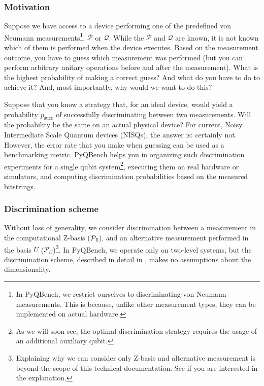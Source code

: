 \documentclass[preprint,12pt, a4paper]{elsarticle}
\newcommand{\1}{{\rm 1\hspace{-0.9mm}l}}
\newcommand{\Id}{{\rm 1\hspace{-0.9mm}l}}
\newcommand{\PP}{\mathcal{P}}
\newcommand{\QQ}{\mathcal{Q}}
\begin{document}
\subsubsection{Motivation}

Suppose we have access to a device performing one of the predefined von Neumann
measurements\footnote{In PyQBench, we restrict ourselves to discriminating von Neumann measurements.
This is because, unlike other measurement types, they can be implemented on actual hardware.
},  $\PP$ or $\QQ$. While the $\PP$ and $\QQ$ are known, it is not known which of them is
performed when the device executes. Based on the measurement outcome, you have to guess which
measurement was performed (but you can perform arbitrary unitary operations before and after the
measurement). What is the highest probability of making a correct guess? And what do you have to do
to achieve it? And, most importantly, why would we want to do this?

Suppose that you know a strategy that, for an ideal device, would yield a probability
$p_{\text{succ}}$ of successfully discriminating between two measurements. Will the probability be
the same on an actual physical device? For current, Noisy Intermediate Scale Quantum devices
(NISQs), the answer is: certainly not. However, the error rate that you make when guessing can be
used as a benchmarking metric. PyQBench helps you in organizing such discrimination experiments for
a single qubit system\footnote{As we will soon see, the optimal discrimination strategy requires
the usage of an additional auxiliary qubit.}, executing them on real hardware or simulators, and
computing discrimination probabilities based on the measured bitstrings.

\subsubsection{Discrimination scheme}

Without loss of generality, we consider discrimination between a measurement in the computational
Z-basis ($\PP_\Id$), and an alternative measurement performed in the basis $U$
($\PP_U$)\footnote{Explaining why we can consider only Z-basis and alternative measurement is beyond
the scope of this technical documentation. See \cite{puchala2018strategies} if you are interested in
the explanation.}. In PyQBench, we operate only on two-level systems, but the discrimination scheme,
described in detail in \cite{puchala2018strategies}, makes no assumptions about the dimensionality.
\end{document}
